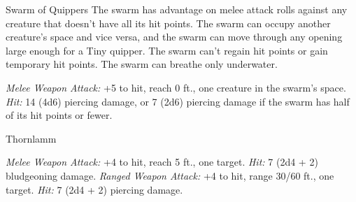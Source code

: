 \documentclass[10pt,a4paper,twoside,twocolumn,openany,bg=print,nodeprecatedcode]{dndbook}
\begin{document}
\begin{DndMonster}[float*=t]{Swarm of Quippers}
\DndMonsterBasics[
armor-class = {13},
hit-points = {\DndDice{8d8 - 8}},
speed = {0 ft., 40 ft. (key)}
]
\DndMonsterAbilityScores[
 str = 13,
 dex = 16,
 con = 9,
 int = 1,
 wis = 7,
 cha = 2
]
\DndMonsterDetails[
damage-resistances = {bludgeoning, piercing, slashing},
senses = {darkvision 60 ft., passive perception 8},
challenge = 1,
]
The swarm has advantage on melee attack rolls against any creature that doesn't have all its hit points.
The swarm can occupy another creature's space and vice versa, and the swarm can move through any opening large enough for a Tiny quipper. The swarm can't regain hit points or gain temporary hit points.
The swarm can breathe only underwater.
\par
{}
\textsl{Melee Weapon Attack:} +5 to hit, reach 0 ft., one creature in the swarm's space. \textsl{Hit:} 14 (4d6) piercing damage, or 7 (2d6) piercing damage if the swarm has half of its hit points or fewer.
\end{DndMonster}


\clearpage

\begin{DndMonster}[float*=t]{Thornlamm}
\DndMonsterBasics[
armor-class = {14 (natural armor)},
hit-points = {\DndDice{6d6}},
speed = {30 ft.}
]
\DndMonsterAbilityScores[
 str = 11,
 dex = 14,
 con = 11,
 int = 3,
 wis = 8,
 cha = 3
]
\DndMonsterDetails[
damage-resistances = {cold, fire, lightning, poison},
senses = {blindsight 60 ft. (blind beyond this radius), passive perception 9},
challenge = 1/4,
]
\par
{}
\textsl{Melee Weapon Attack:} +4 to hit, reach 5 ft., one target. \textsl{Hit:} 7 (2d4 + 2) bludgeoning damage.
\textsl{Ranged Weapon Attack:} +4 to hit, range 30/60 ft., one target. \textsl{Hit:} 7 (2d4 + 2) piercing damage.
\end{DndMonster}
\end{document}

